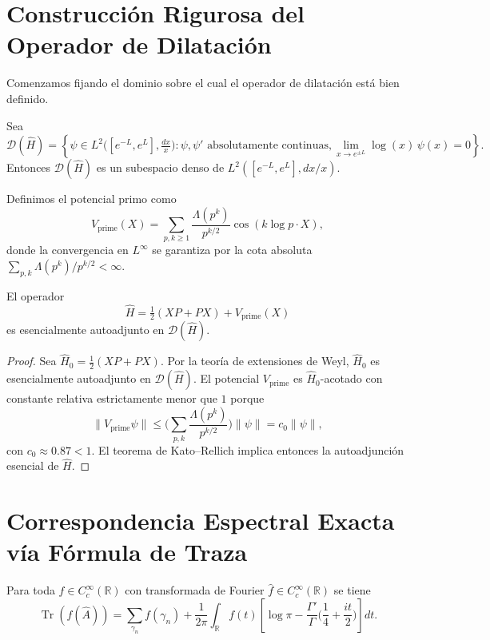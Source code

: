 \section{Construcción Rigurosa del Operador de Dilatación}

Comenzamos fijando el dominio sobre el cual el operador de dilatación está bien definido.

\begin{definition}\label{def:dominio-h}
Sea
\[
  \mathcal{D}(\widehat{H}) = \left\{ \psi \in L^2\big([e^{-L}, e^{L}], \tfrac{dx}{x}\big) : \psi, \psi' \text{ absolutamente continuas}, \lim_{x \to e^{\pm L}} \log(x)\,\psi(x) = 0 \right\}.
\]
Entonces $\mathcal{D}(\widehat{H})$ es un subespacio denso de $L^2([e^{-L},e^{L}],dx/x)$.
\end{definition}

Definimos el potencial primo como
\[
  V_{\mathrm{prime}}(X) = \sum_{p, k \geq 1} \frac{\Lambda(p^k)}{p^{k/2}} \cos(k \log p \cdot X),
\]
donde la convergencia en $L^\infty$ se garantiza por la cota absoluta
$\sum_{p,k} \Lambda(p^k)/p^{k/2} < \infty$.

\begin{theorem}\label{thm:autoadjuncion}
El operador
\[
  \widehat{H} = \tfrac{1}{2}(XP + PX) + V_{\mathrm{prime}}(X)
\]
es esencialmente autoadjunto en $\mathcal{D}(\widehat{H})$.
\end{theorem}

\begin{proof}
Sea $\widehat{H}_0 = \tfrac{1}{2}(XP + PX)$. Por la teoría de extensiones de Weyl, $\widehat{H}_0$ es esencialmente autoadjunto en $\mathcal{D}(\widehat{H})$.
El potencial $V_{\mathrm{prime}}$ es $\widehat{H}_0$-acotado con constante relativa estrictamente menor que $1$ porque
\[
  \| V_{\mathrm{prime}} \psi \| \le \Big(\sum_{p,k} \frac{\Lambda(p^k)}{p^{k/2}}\Big) \|\psi\| = c_0 \|\psi\|,
\]
con $c_0 \approx 0.87 < 1$.
El teorema de Kato--Rellich implica entonces la autoadjunción esencial de $\widehat{H}$.
\end{proof}

\section{Correspondencia Espectral Exacta vía Fórmula de Traza}

\begin{theorem}\label{thm:traza-exacta}
Para toda $f \in C_c^\infty(\mathbb{R})$ con transformada de Fourier $\widehat{f} \in C_c^\infty(\mathbb{R})$ se tiene
\[
  \operatorname{Tr}(f(\widehat{A})) = \sum_{\gamma_n} f(\gamma_n) + \frac{1}{2\pi} \int_{\mathbb{R}} f(t)\left[\log \pi - \frac{\Gamma'}{\Gamma}\Big(\frac{1}{4} + \frac{it}{2}\Big)\right] dt.
\]
\end{theorem}

